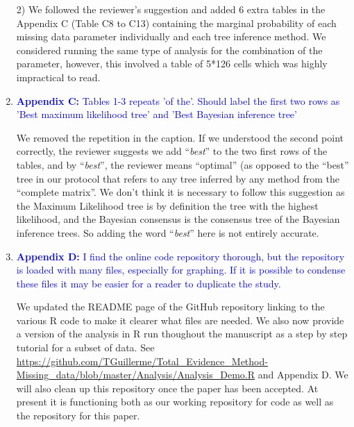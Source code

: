 \documentclass[12pt,letterpaper]{article}
\begin{document}
\begin{enumerate}
2) We followed the reviewer's suggestion and added 6 extra tables in the Appendix C (Table C8 to C13) containing the marginal probability of each missing data parameter individually and each tree inference method.
We considered running the same type of analysis for the combination of the parameter, however, this involved a table of 5*126 cells which was highly impractical to read.

\item{\textcolor{blue}{\textbf{Appendix C:} Tables 1-3 repeats 'of the'. Should label the first two rows as 'Best maximum likelihood tree' and 'Best Bayesian inference tree'}}

We removed the repetition in the caption.
If we understood the second point correctly, the reviewer suggests we add ``\textit{best}'' to the two first rows of the tables, and by ``\textit{best}'', the reviewer means ``optimal'' (as opposed to the ``best'' tree in our protocol that refers to any tree inferred by any method from the ``complete matrix''.
We don't think it is necessary to follow this suggestion as the Maximum Likelihood tree is by definition the tree with the highest likelihood, and the Bayesian consensus is the consensus tree of the Bayesian inference trees.
So adding the word ``\textit{best}'' here is not entirely accurate.

\item{\textcolor{blue}{\textbf{Appendix D:} I find the online code repository thorough, but the repository is loaded with many files, especially for graphing. If it is possible to condense these files it may be easier for a reader to duplicate the study.}}

We updated the README page of the GitHub repository linking to the various R code to make it clearer what files are needed.
We also now provide a version of the analysis in R run thoughout the manuscript as a step by step tutorial for a subset of data.
See \url{https://github.com/TGuillerme/Total_Evidence_Method-Missing_data/blob/master/Analysis/Analysis_Demo.R} and Appendix D.
We will also clean up this repository once the paper has been accepted.
At present it is functioning both as our working repository for code as well as the repository for this paper.

\end{enumerate}
\end{document}
